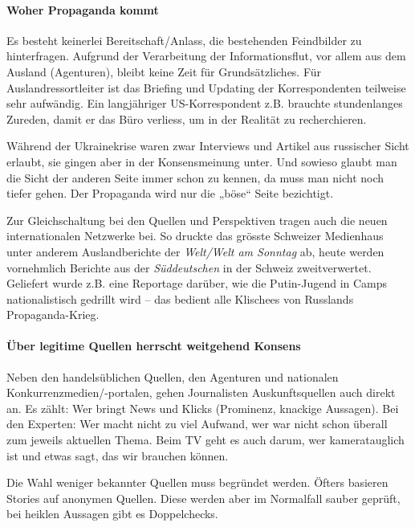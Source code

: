 \hypertarget{woher-propaganda-kommt}{%
\paragraph{Woher Propaganda kommt}\label{woher-propaganda-kommt}}

Es besteht keinerlei Bereitschaft/Anlass, die bestehenden Feindbilder zu
hinterfragen. Aufgrund der Verarbeitung der Informationsflut, vor allem
aus dem Ausland (Agenturen), bleibt keine Zeit für Grundsätzliches. Für
Auslandressortleiter ist das Briefing und Updating der Korrespondenten
teilweise sehr aufwändig. Ein langjähriger US-Korrespondent z.B.
brauchte stundenlanges Zureden, damit er das Büro verliess, um in der
Realität zu recherchieren.

Während der Ukrainekrise waren zwar Interviews und Artikel aus
russischer Sicht erlaubt, sie gingen aber in der Konsensmeinung unter.
Und sowieso glaubt man die Sicht der anderen Seite immer schon zu
kennen, da muss man nicht noch tiefer gehen. Der Propaganda wird nur die
„böse`` Seite bezichtigt.

Zur Gleichschaltung bei den Quellen und Perspektiven tragen auch die
neuen internationalen Netzwerke bei. So druckte das grösste Schweizer
Medienhaus unter anderem Auslandberichte der \emph{Welt/Welt am Sonntag}
ab, heute werden vornehmlich Berichte aus der \emph{Süddeutschen} in der
Schweiz zweitverwertet. Geliefert wurde z.B. eine Reportage darüber, wie
die Putin-Jugend in Camps nationalistisch gedrillt wird -- das bedient
alle Klischees von Russlands Propaganda-Krieg.

\hypertarget{uxfcber-legitime-quellen-herrscht-weitgehend-konsens}{%
\paragraph{Über legitime Quellen herrscht weitgehend
Konsens}\label{uxfcber-legitime-quellen-herrscht-weitgehend-konsens}}

Neben den handelsüblichen Quellen, den Agenturen und nationalen
Konkurrenzmedien/-portalen, gehen Journalisten Auskunftsquellen auch
direkt an. Es zählt: Wer bringt News und Klicks (Prominenz, knackige
Aussagen). Bei den Experten: Wer macht nicht zu viel Aufwand, wer war
nicht schon überall zum jeweils aktuellen Thema. Beim TV geht es auch
darum, wer kameratauglich ist und etwas sagt, das wir brauchen können.

Die Wahl weniger bekannter Quellen muss begründet werden. Öfters
basieren Stories auf anonymen Quellen. Diese werden aber im Normalfall
sauber geprüft, bei heiklen Aussagen gibt es Doppelchecks.

